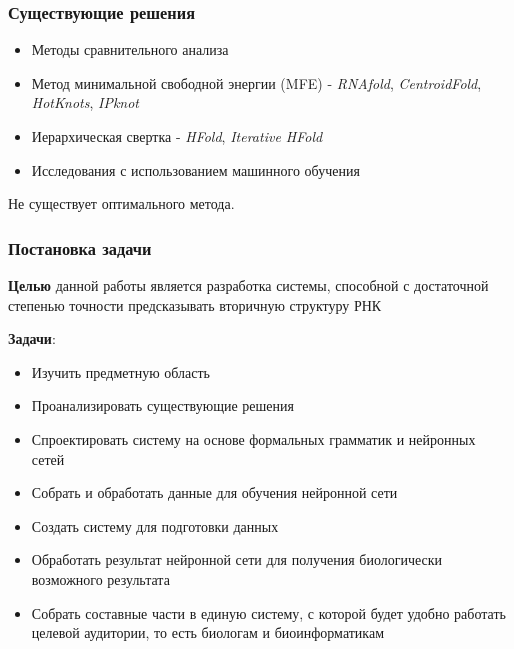 \documentclass{beamer}
\begin{document}
\begin{frame}
  \transwipe[direction=90]
  \frametitle{Существующие решения}
  \begin{itemize}
  	\item Методы сравнительного анализа
    \item Метод минимальной свободной энергии (MFE) - \textit{RNAfold}, \textit{CentroidFold}, \textit{HotKnots}, \textit{IPknot}
    \item Иерархическая свертка - \textit{HFold}, \textit{Iterative HFold}
    \item Исследования с использованием машинного обучения
   
  \end{itemize}\medskip
   Не существует оптимального метода.

\end{frame}

\begin{frame}
  \transwipe[direction=90]
  \frametitle{Постановка задачи}
  \textbf{Целью} данной работы является разработка системы, способной с достаточной степенью точности предсказывать вторичную структуру РНК 
  
  \textbf{Задачи}:
  \begin{itemize}
    \item Изучить предметную область
    \item Проанализировать существующие решения
    \item Спроектировать систему на основе формальных грамматик и нейронных сетей
    \item Собрать и обработать данные для обучения нейронной сети
    \item Создать систему для подготовки данных
    \item Обработать результат нейронной сети для получения биологически возможного результата
    \item Собрать составные части в единую систему, с которой будет удобно работать целевой аудитории, то есть биологам и биоинформатикам
  \end{itemize}
\end{frame}
            
\end{document}
